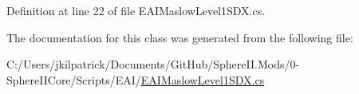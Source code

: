 Definition at line 22 of file E\+A\+I\+Maslow\+Level1\+S\+D\+X.\+cs.



The documentation for this class was generated from the following file\+:\begin{DoxyCompactItemize}
\item 
C\+:/\+Users/jkilpatrick/\+Documents/\+Git\+Hub/\+Sphere\+I\+I.\+Mods/0-\/\+Sphere\+I\+I\+Core/\+Scripts/\+E\+A\+I/\mbox{\hyperlink{_e_a_i_maslow_level1_s_d_x_8cs}{E\+A\+I\+Maslow\+Level1\+S\+D\+X.\+cs}}\end{DoxyCompactItemize}
